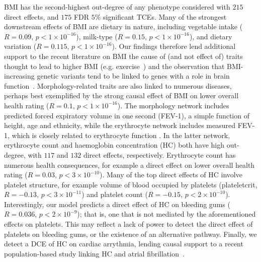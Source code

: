 \documentclass{article}
\begin{document}
BMI has the second-highest out-degree of any phenotype considered with
$215$ direct effects, and $175$ FDR $5\%$ significant TCEs.
Many of the strongest downstream effects of BMI are dietary
in nature, including vegetable intake ($R = 0.09$, $p < 1\times 10^{-16}$),
milk-type ($R = 0.15$, $p < 1\times 10^{-16}$), and dietary variation ($R = 0.115$, $p < 1\times 10^{-16}$).
Our findings therefore lend additional support to the recent literature on BMI the cause of (and not effect of)
traits thought to lead to higher BMI (e.g. exercise~\cite{Richmond2014}) and the observation that
BMI-increasing genetic variants tend to be linked to genes with a role in brain
function~\cite{Locke2015,Zhu2016,Ndiaye2020}. Morphology-related traits are also linked
to numerous diseases, perhaps best exemplified by the strong causal effect of BMI on lower overall
health rating ($R = 0.1$, $p < 1 \times 10^{-16}$). The
morphology network includes predicted forced expiratory volume in
one second (FEV-1), a simple function of height, age and ethnicity,
while the erythrocyte network includes measured FEV-1, which is closely related to
erythrocyte function . In the latter network, erythrocyte count and haemoglobin concentration (HC)
both have high out-degree, with $117$ and $132$ direct effects, respectively.
Erythrocyte count has numerous health consequences,
for example a direct effect on lower overall health rating ($R = 0.03$, $p < 3 \times 10^{-10}$).
Many of the top direct effects of HC involve platelet structure,
for example volume of blood occupied by platelets (plateletcrit, $R = -0.13$, $p < 3 \times 10^{-11}$)
and platelet count
($R = -0.15$, $p < 2 \times 10^{-10}$). Interestingly, our model predicts a direct effect of
HC on bleeding gums ($R = 0.036$, $p < 2 \times 10^{-9}$); that is, one
that is not mediated by the aforementioned effects on platelets. This may reflect a lack of power to detect
the direct effect of platelets on bleeding gums, or the existence of an alternative pathway.
Finally, we detect a DCE of HC on cardiac arrythmia, lending causal
support to a recent population-based study linking HC and atrial fibrillation~\cite{Lim2020}.
\end{document}
